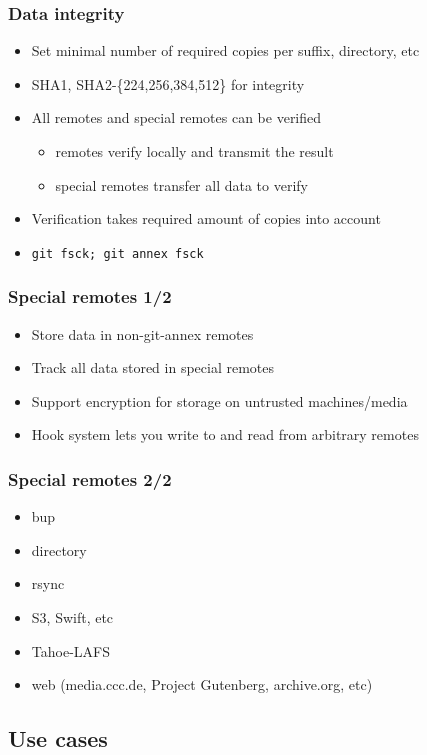 \documentclass[t]{beamer}
\begin{document}
\begin{frame}
	\frametitle{Data integrity}
	\begin{itemize}
		\item Set minimal number of required copies per suffix, directory, etc
		\item SHA1, SHA2-\{224,256,384,512\} for integrity
		\item All remotes and special remotes can be verified
		\begin{itemize}
			\item remotes verify locally and transmit the result
			\item special remotes transfer all data to verify
		\end{itemize}
		\item Verification takes required amount of copies into account
		\item \texttt{git fsck; git annex fsck}
	\end{itemize}
\end{frame}

\begin{frame}
	\frametitle{Special remotes 1/2}
	\begin{itemize}
		\item Store data in non-git-annex remotes
		\item Track all data stored in special remotes
		\item Support encryption for storage on untrusted machines/media
		\item Hook system lets you write to and read from arbitrary remotes
	\end{itemize}
\end{frame}

\begin{frame}
	\frametitle{Special remotes 2/2}
	\begin{itemize}
		\item bup
		\item directory
		\item rsync
		\item S3, Swift, etc
		\item Tahoe-LAFS
		\item web (media.ccc.de, Project Gutenberg, archive.org, etc)
	\end{itemize}
\end{frame}


\subsection{Use cases}
\end{document}
